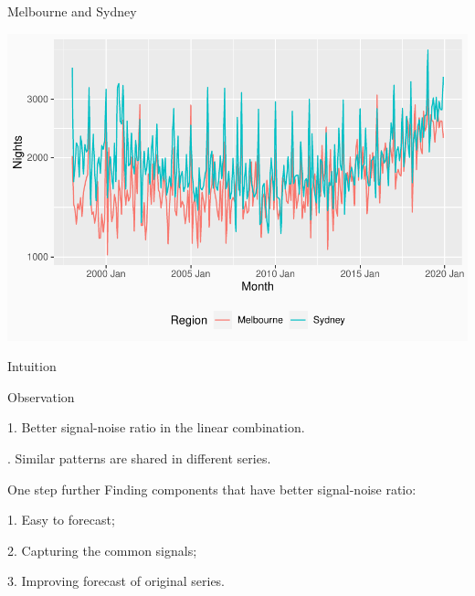 \documentclass[14pt,ignorenonframetext,]{beamer}
\begin{document}
\begin{frame}{Melbourne and Sydney}
\protect\hypertarget{melbourne-and-sydney}{}
\begin{center}
\includegraphics[width=\linewidth]{plot/p_syd_mel}
\end{center}
\end{frame}

\begin{frame}{Intuition}
\protect\hypertarget{intuition}{}
\begin{block}{Observation}

1. Better signal-noise ratio in the linear combination.

. Similar patterns are shared in different series.
\end{block}

\pause

\begin{alertblock}{One step further}
Finding components that have better signal-noise ratio:


1. Easy to forecast;

2. Capturing the common signals;

3. Improving forecast of original series.
\end{alertblock}
\end{frame}
\end{document}

